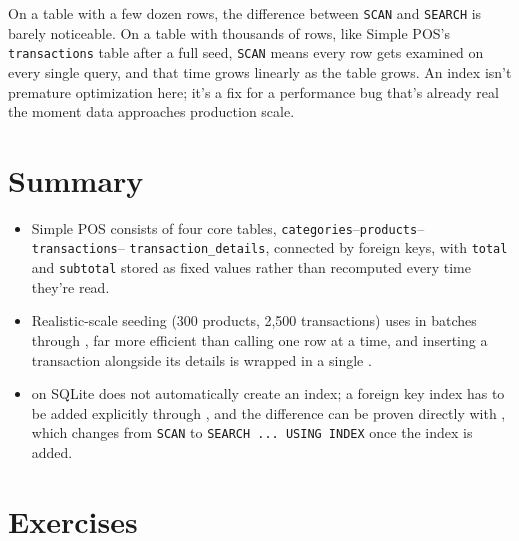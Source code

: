 \begin{warningbox}
On a table with a few dozen rows, the difference between \texttt{SCAN}
and \texttt{SEARCH} is barely noticeable. On a table with thousands of
rows, like Simple POS's \texttt{transactions} table after a full seed,
\texttt{SCAN} means every row gets examined on every single query, and
that time grows linearly as the table grows. An index isn't premature
optimization here; it's a fix for a performance bug that's already real
the moment data approaches production scale.
\end{warningbox}


\section{Summary}
\label{sec:desain-basis-data-rangkuman}

\begin{itemize}
  \item Simple POS consists of four core tables,
    \texttt{categories}--\texttt{products}--\texttt{transactions}--%
    \texttt{transaction\_details}, connected by foreign keys, with
    \texttt{total} and \texttt{subtotal} stored as fixed values rather
    than recomputed every time they're read.
  \item Realistic-scale seeding (300 products, 2,500 transactions) uses
     in batches through
    , far more efficient than calling
     one row at a time, and inserting a
    transaction alongside its details is wrapped in a single
    .
  \item {} on SQLite does not automatically create an
    index; a foreign key index has to be added explicitly through
    , and the difference can be proven directly
    with , which changes from \texttt{SCAN} to
    \texttt{SEARCH ... USING INDEX} once the index is added.
\end{itemize}

\section{Exercises}

